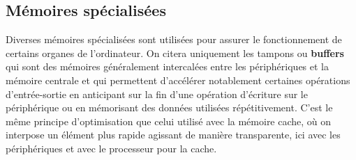 \documentclass{report}
\begin{document}
\subsection{Mémoires spécialisées}
Diverses mémoires spécialisées sont utilisées pour assurer le fonctionnement de certains organes de l'ordinateur. On citera uniquement les tampons ou {\bf buffers} qui sont des mémoires généralement intercalées entre les périphériques et la mémoire centrale et qui permettent d'accélérer notablement certaines opérations d'entrée-sortie en anticipant sur la fin d'une opération d'écriture sur le périphérique ou en mémorisant des données utilisées répétitivement. C'est le même principe d'optimisation que celui utilisé avec la mémoire cache, où on interpose un élément plus rapide agissant de manière transparente, ici avec les périphériques et avec le processeur pour la cache.
\end{document}
